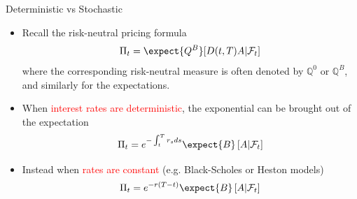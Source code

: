 \documentclass{beamer}
\begin{document}
\begin{frame}{Deterministic vs Stochastic}
	\begin{itemize}
		\item<0-> Recall the risk-neutral pricing formula \begin{equation*}
			\Pi_t = \expect{Q^B}[D(t,T)A|\mathcal{F}_t]
		\end{equation*}
		where the corresponding risk-neutral measure is often denoted by $\mathbb{Q}^0$ or $\mathbb{Q}^B$, and similarly for the expectations. 
		\item<1-> When \textcolor{red}{interest rates are deterministic}, the exponential can be brought out of the expectation
		\begin{equation*}
			\Pi_t = e^{-\int_t^T r_s ds} \expect{B}\left[A|\mathcal{F}_t\right]
		\end{equation*}
		\item<2-> Instead when \textcolor{red}{rates are constant} (e.g. Black-Scholes or Heston models)
		\begin{equation*}
			\Pi_t = e^{-r(T-t)}\expect{B}\left[A|\mathcal{F}_t\right]
		\end{equation*}
	\end{itemize}
\end{frame}
\end{document}

